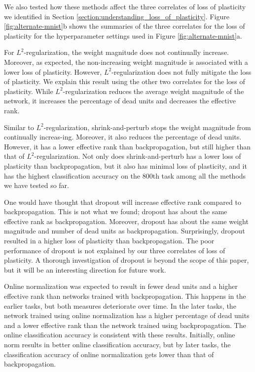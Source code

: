 \documentclass[review, number,3p]{elsarticle}
\begin{document}
We also tested how these methods affect the three correlates of loss of plasticity we identified in Section \ref{section:understanding_loss_of_plasticity}.
Figure \ref{fig:alternate-mnist}b shows the summaries of the three correlates for the loss of plasticity for the hyperparameter settings used in Figure \ref{fig:alternate-mnist}a.


For $L^2$-regularization, the weight magnitude does not continually increase.
Moreover, as expected, the non-increasing weight magnitude is associated with a lower loss of plasticity.
However, $L^2$-regularization does not fully mitigate the loss of plasticity.
We explain this result using the other two correlates for the loss of plasticity.
While $L^2$-regularization reduces the average weight magnitude of the network, it increases the percentage of dead units and decreases the effective rank.

Similar to $L^2$-regularization, shrink-and-perturb stops the weight magnitude from continually increas-ing.
Moreover, it also reduces the percentage of dead units.
However, it has a lower effective rank than backpropagation, but still higher than that of $L^2$-regularization.
Not only does shrink-and-perturb has a lower loss of plasticity than backpropagation, but it also has minimal loss of plasticity, and it has the highest classification accuracy on the 800th task among all the methods we have tested so far.

One would have thought that dropout will increase effective rank compared to backpropagation.
This is not what we found; dropout has about the same effective rank as backpropagation.
Moreover, dropout has about the same weight magnitude and number of dead units as backpropagation.
Surprisingly, dropout resulted in a higher loss of plasticity than backpropagation.
The poor performance of dropout is not explained by our three correlates of loss of plasticity.
A thorough investigation of dropout is beyond the scope of this paper, but it will be an interesting direction for future work.

Online normalization was expected to result in fewer dead units and a higher effective rank than networks trained with backpropagation.
This happens in the earlier tasks, but both measures deteriorate over time.
In the later tasks, the network trained using online normalization has a higher percentage of dead units and a lower effective rank than the network trained using backpropagation.
The online classification accuracy is consistent with these results.
Initially, online norm results in better online classification accuracy, but by later tasks, the classification accuracy of online normalization gets lower than that of backpropagation.
\end{document}
